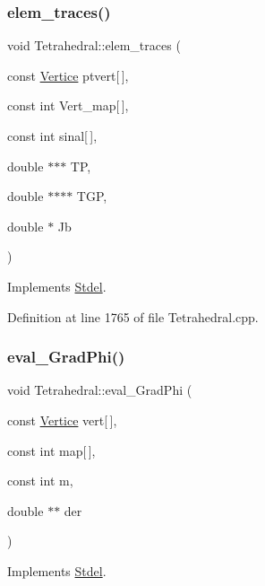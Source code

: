 \subsubsection{\texorpdfstring{elem\+\_\+traces()}{elem\_traces()}}
{\footnotesize\ttfamily void Tetrahedral\+::elem\+\_\+traces (\begin{DoxyParamCaption}\item[{const \hyperlink{structVertice}{Vertice}}]{ptvert\mbox{[}$\,$\mbox{]},  }\item[{const int}]{Vert\+\_\+map\mbox{[}$\,$\mbox{]},  }\item[{const int}]{sinal\mbox{[}$\,$\mbox{]},  }\item[{double $\ast$$\ast$$\ast$}]{TP,  }\item[{double $\ast$$\ast$$\ast$$\ast$}]{T\+GP,  }\item[{double $\ast$}]{Jb }\end{DoxyParamCaption})\hspace{0.3cm}{\ttfamily [virtual]}}



Implements \hyperlink{classStdel_a3d72869352a2ff5eeb23972eca3b391e}{Stdel}.



Definition at line 1765 of file Tetrahedral.\+cpp.

\mbox{\label{classTetrahedral_a6dfb6e6d44f3b5c1127e893e14a759d0}} 
\subsubsection{\texorpdfstring{eval\+\_\+\+Grad\+Phi()}{eval\_GradPhi()}}
{\footnotesize\ttfamily void Tetrahedral\+::eval\+\_\+\+Grad\+Phi (\begin{DoxyParamCaption}\item[{const \hyperlink{structVertice}{Vertice}}]{vert\mbox{[}$\,$\mbox{]},  }\item[{const int}]{map\mbox{[}$\,$\mbox{]},  }\item[{const int}]{m,  }\item[{double $\ast$$\ast$}]{der }\end{DoxyParamCaption})\hspace{0.3cm}{\ttfamily [virtual]}}



Implements \hyperlink{classStdel_a83a7a53e4be6da7c3a615967e4504b07}{Stdel}.



